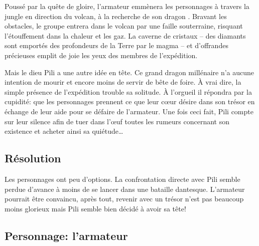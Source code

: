 Poussé par la quête de gloire, l'armateur emmènera les personnages à travers la jungle en direction du volcan, à la recherche de \og son dragon \fg.
Bravant les obstacles, le groupe entrera dans le volcan par une faille souterraine, risquant l'étouffement dans la chaleur et les gaz.
La caverne de cristaux -- des diamants sont emportés des profondeurs de la Terre par le magma -- et d'offrandes précieuses emplit de joie les yeux des membres de l'expédition.

Mais le dieu Pili a une autre idée en tête.
Ce grand dragon millénaire n'a aucune intention de mourir et encore moins de servir de bête de foire.
À vrai dire, la simple présence de l'expédition trouble sa solitude.
À l'orgueil il répondra par la cupidité: que les personnages prennent ce que leur cœur désire dans son trésor en échange de leur aide pour se défaire de l'armateur.
Une fois ceci fait, Pili compte sur leur silence afin de tuer dans l'œuf toutes les rumeurs concernant son existence et acheter ainsi sa quiétude\dots

\subsection{Résolution}

Les personnages ont peu d'options.
La confrontation directe avec Pili semble perdue d'avance à moins de se lancer dans une bataille dantesque.
L'armateur pourrait être convaincu, après tout, revenir avec un trésor n'est pas beaucoup moins glorieux mais Pili semble bien décidé à avoir sa tête!

\subsection{Personnage: l'armateur}

\vfill
{}
\vfill
